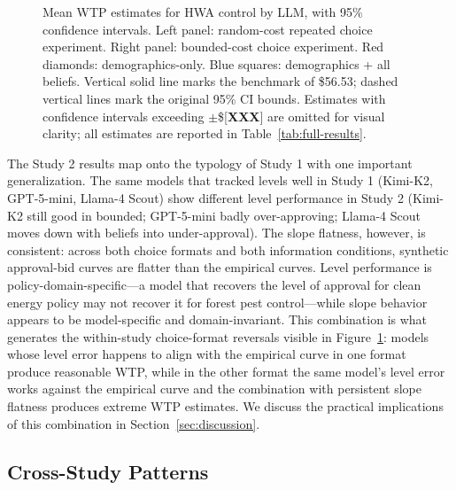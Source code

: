 \documentclass[12pt]{article}
\begin{document}
\begin{figure}[h]
    \centering
    \caption{Mean WTP estimates for HWA control by LLM, with 95\%
    confidence intervals. Left panel: random-cost repeated choice
    experiment. Right panel: bounded-cost choice experiment. Red
    diamonds: demographics-only. Blue squares: demographics + all
    beliefs. Vertical solid line marks the \textcite{Giguere2020}
    benchmark of \$56.53; dashed vertical lines mark the original 95\%
    CI bounds. Estimates with confidence intervals exceeding
    $\pm$\$[\textbf{XXX}] are omitted for visual clarity; all estimates
    are reported in Table~\ref{tab:full-results}.}
    \label{fig:hwa-wtp}
\end{figure}

The Study 2 results map onto the typology of Study 1 with one important
generalization. The same models that tracked levels well in Study 1
(Kimi-K2, GPT-5-mini, Llama-4 Scout) show different level performance
in Study 2 (Kimi-K2 still good in bounded; GPT-5-mini badly
over-approving; Llama-4 Scout moves down with beliefs into
under-approval). The slope flatness, however, is consistent: across
both choice formats and both information conditions, synthetic
approval-bid curves are flatter than the empirical curves. Level
performance is policy-domain-specific---a model that recovers the level
of approval for clean energy policy may not recover it for forest
pest control---while slope behavior appears to be model-specific and
domain-invariant. This combination is what generates the within-study
choice-format reversals visible in Figure~\ref{fig:hwa-wtp}: models
whose level error happens to align with the empirical curve in one
format produce reasonable WTP, while in the other format the same
model's level error works against the empirical curve and the
combination with persistent slope flatness produces extreme WTP
estimates. We discuss the practical implications of this combination
in Section~\ref{sec:discussion}.

\subsection{Cross-Study Patterns}\label{sec:results-cross}
\end{document}

